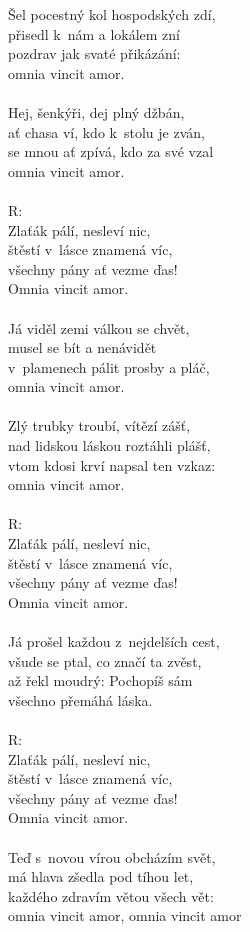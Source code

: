 \documentclass[a4paper,twocolumn,openany,nodeprecatedcode, justified]{dndbook}
\begin{document}
	\newpage
	\begin{DndReadAloud}
		\sffamily
		Šel pocestný kol hospodských zdí,\\
		přisedl k~nám a lokálem zní\\
		pozdrav jak svaté přikázání:\\
		omnia vincit amor.\\
		\\
		Hej, šenkýři, dej plný džbán,\\
		ať chasa ví, kdo k~stolu je zván,\\
		se mnou ať zpívá, kdo za své vzal\\
		omnia vincit amor.\\
		\\
		R:\\
		Zlaťák pálí, nesleví nic,\\
		štěstí v~lásce znamená víc,\\
		všechny pány ať vezme ďas!\\
		Omnia vincit amor.\\
		\\
		Já viděl zemi válkou se chvět,\\
		musel se bít a nenávidět\\
		v~plamenech pálit prosby a pláč,\\
		omnia vincit amor.\\
		\\
		Zlý trubky troubí, vítězí zášť,\\
		nad lidskou láskou roztáhli plášť,\\
		vtom kdosi krví napsal ten vzkaz:\\
		omnia vincit amor.\\
		\\
		R:\\
		Zlaťák pálí, nesleví nic,\\
		štěstí v~lásce znamená víc,\\
		všechny pány ať vezme ďas!\\
		Omnia vincit amor.\\
		\\
		Já prošel každou z~nejdelších cest,\\
		všude se ptal, co značí ta zvěst,\\
		až řekl moudrý: Pochopíš sám\\
		všechno přemáhá láska.\\
		\\
		R:\\
		Zlaťák pálí, nesleví nic,\\
		štěstí v~lásce znamená víc,\\
		všechny pány ať vezme ďas!\\
		Omnia vincit amor.\\
		\\
		Teď s~novou vírou obcházím svět,\\
		má hlava zšedla pod tíhou let,\\
		každého zdravím větou všech vět:\\
		omnia vincit amor, omnia vincit amor
	\end{DndReadAloud}
\end{document}
